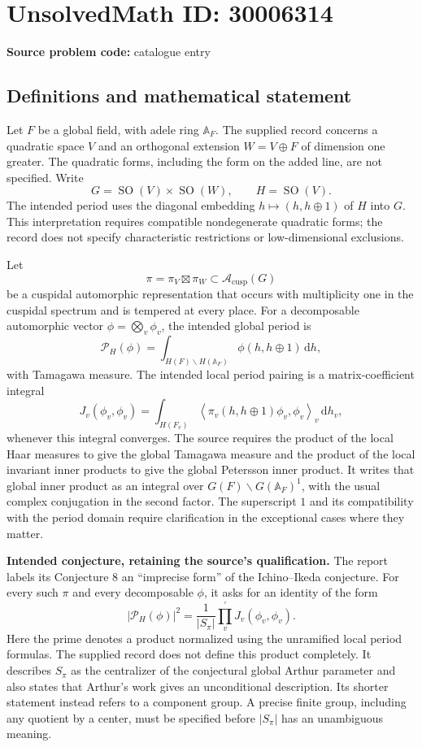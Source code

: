 \documentclass[11pt]{article}
\begin{document}
\section*{UnsolvedMath ID: 30006314}
\textbf{Source problem code:} catalogue entry
\subsection{Definitions and mathematical statement}
Let \(F\) be a global field, with adele ring \(\mathbb A_F\). The supplied record concerns a quadratic space \(V\) and an orthogonal extension \(W=V\oplus F\) of dimension one greater. The quadratic forms, including the form on the added line, are not specified. Write
\[
G=\operatorname{SO}(V)\times\operatorname{SO}(W),\qquad H=\operatorname{SO}(V).
\]
The intended period uses the diagonal embedding \(h\mapsto(h,h\oplus 1)\) of \(H\) into \(G\). This interpretation requires compatible nondegenerate quadratic forms; the record does not specify characteristic restrictions or low-dimensional exclusions.

Let
\[
\pi=\pi_V\boxtimes\pi_W\subset\mathcal A_{\mathrm{cusp}}(G)
\]
be a cuspidal automorphic representation that occurs with multiplicity one in the cuspidal spectrum and is tempered at every place. For a decomposable automorphic vector \(\phi=\bigotimes_v\phi_v\), the intended global period is
\[
\mathcal P_H(\phi)=\int_{H(F)\backslash H(\mathbb A_F)}\phi(h,h\oplus1)\,\mathrm dh,
\]
with Tamagawa measure. The intended local period pairing is a matrix-coefficient integral
\[
J_v(\phi_v,\phi_v)=\int_{H(F_v)}
\left\langle\pi_v(h,h\oplus1)\phi_v,\phi_v\right\rangle_v\,\mathrm dh_v,
\]
whenever this integral converges. The source requires the product of the local Haar measures to give the global Tamagawa measure and the product of the local invariant inner products to give the global Petersson inner product. It writes that global inner product as an integral over \(G(F)\backslash G(\mathbb A_F)^1\), with the usual complex conjugation in the second factor. The superscript \(1\) and its compatibility with the period domain require clarification in the exceptional cases where they matter.

\textbf{Intended conjecture, retaining the source's qualification.} The report labels its Conjecture 8 an ``imprecise form'' of the Ichino--Ikeda conjecture. For every such \(\pi\) and every decomposable \(\phi\), it asks for an identity of the form
\[
\left|\mathcal P_H(\phi)\right|^2
=\frac{1}{|S_\pi|}\prod_v^{\prime}J_v(\phi_v,\phi_v).
\]
Here the prime denotes a product normalized using the unramified local period formulas. The supplied record does not define this product completely. It describes \(S_\pi\) as the centralizer of the conjectural global Arthur parameter and also states that Arthur's work gives an unconditional description. Its shorter statement instead refers to a component group. A precise finite group, including any quotient by a center, must be specified before \(|S_\pi|\) has an unambiguous meaning.
\end{document}
